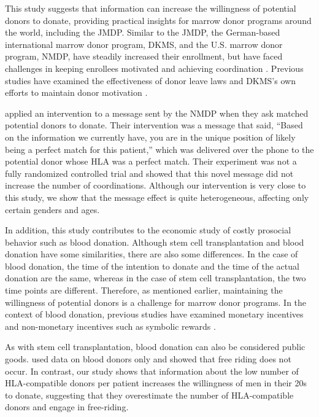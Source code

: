 \documentclass[
]{article}
\begin{document}
This study suggests that information can increase the willingness of potential donors to donate, providing practical insights for marrow donor programs around the world, including the JMDP. Similar to the JMDP, the German-based international marrow donor program, DKMS, and the U.S. marrow donor program, NMDP, have steadily increased their enrollment, but have faced challenges in keeping enrollees motivated and achieving coordination \citep{Switzer1999, Switzer2004, Haylock2022}. Previous studies have examined the effectiveness of donor leave laws \citep{Lacetera2014} and DKMS's own efforts to maintain donor motivation \citep{Haylock2022}.

\citet{Switzer2018} applied an intervention to a message sent by the NMDP when they ask matched potential donors to donate. Their intervention was a message that said, ``Based on the information we currently have, you are in the unique position of likely being a perfect match for this patient,'' which was delivered over the phone to the potential donor whose HLA was a perfect match. Their experiment was not a fully randomized controlled trial and showed that this novel message did not increase the number of coordinations. Although our intervention is very close to this study, we show that the message effect is quite heterogeneous, affecting only certain genders and ages.

In addition, this study contributes to the economic study of costly prosocial behavior such as blood donation. Although stem cell transplantation and blood donation have some similarities, there are also some differences. In the case of blood donation, the time of the intention to donate and the time of the actual donation are the same, whereas in the case of stem cell transplantation, the two time points are different. Therefore, as mentioned earlier, maintaining the willingness of potential donors is a challenge for marrow donor programs. In the context of blood donation, previous studies have examined monetary incentives and non-monetary incentives such as symbolic rewards \citep{Mellstrom2008, Lacetera2010}.

As with stem cell transplantation, blood donation can also be considered public goods. \citet{Wildman2009} used data on blood donors only and showed that free riding does not occur. In contrast, our study shows that information about the low number of HLA-compatible donors per patient increases the willingness of men in their 20s to donate, suggesting that they overestimate the number of HLA-compatible donors and engage in free-riding.
\end{document}
